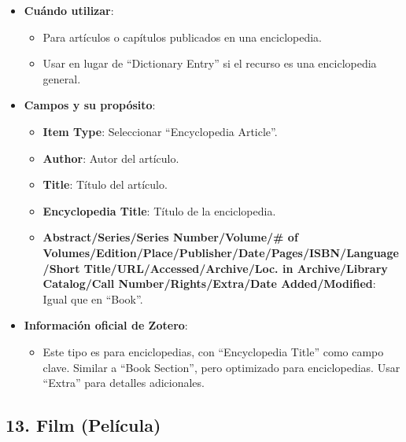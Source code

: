 \documentclass[
  jou,
  floatsintext,
  longtable,
  a4paper,
  nolmodern,
  notxfonts,
  notimes,
  colorlinks=true,linkcolor=blue,citecolor=blue,urlcolor=blue]{apa7}
\providecommand{\tightlist}{%
  \setlength{\itemsep}{0pt}\setlength{\parskip}{0pt}}
\begin{document}
\begin{itemize}
\tightlist
\item
  \textbf{Cuándo utilizar}:

  \begin{itemize}
  \tightlist
  \item
    Para artículos o capítulos publicados en una enciclopedia.
  \item
    Usar en lugar de ``Dictionary Entry'' si el recurso es una
    enciclopedia general.
  \end{itemize}
\item
  \textbf{Campos y su propósito}:

  \begin{itemize}
  \tightlist
  \item
    \textbf{Item Type}: Seleccionar ``Encyclopedia Article''.
  \item
    \textbf{Author}: Autor del artículo.
  \item
    \textbf{Title}: Título del artículo.
  \item
    \textbf{Encyclopedia Title}: Título de la enciclopedia.
  \item
    \textbf{Abstract/Series/Series Number/Volume/\# of
    Volumes/Edition/Place/Publisher/Date/Pages/ISBN/Language/Short
    Title/URL/Accessed/Archive/Loc. in Archive/Library Catalog/Call
    Number/Rights/Extra/Date Added/Modified}: Igual que en ``Book''.
  \end{itemize}
\item
  \textbf{Información oficial de Zotero}:

  \begin{itemize}
  \tightlist
  \item
    Este tipo es para enciclopedias, con ``Encyclopedia Title'' como
    campo clave. Similar a ``Book Section'', pero optimizado para
    enciclopedias. Usar ``Extra'' para detalles adicionales.
  \end{itemize}
\end{itemize}

\subsection{13. Film (Película)}\label{film-peluxedcula}
\end{document}
